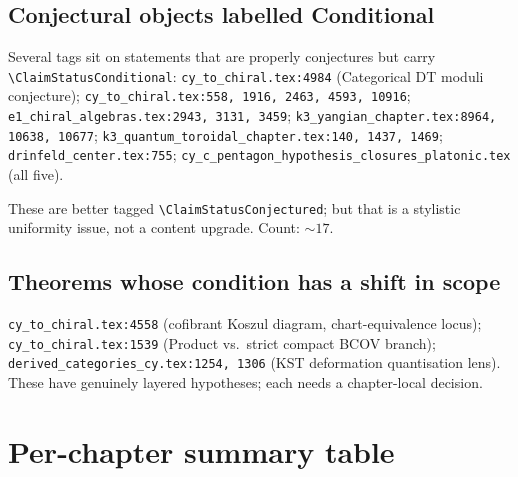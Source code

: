 \documentclass[11pt]{amsart}
\begin{document}
{{\subsection{Conjectural objects labelled Conditional}

Several tags sit on statements that are properly conjectures but carry
\texttt{\textbackslash ClaimStatusConditional}: \texttt{cy\_to\_chiral.tex:4984} (Categorical DT
moduli conjecture); \texttt{cy\_to\_chiral.tex:558, 1916, 2463, 4593, 10916};
\texttt{e1\_chiral\_algebras.tex:2943, 3131, 3459}; \texttt{k3\_yangian\_chapter.tex:8964, 10638, 10677}; \texttt{k3\_quantum\_toroidal\_chapter.tex:140, 1437, 1469}; \texttt{drinfeld\_center.tex:755}; \texttt{cy\_c\_pentagon\_hypothesis\_closures\_platonic.tex} (all five).

These are better tagged \texttt{\textbackslash ClaimStatusConjectured};
but that is a stylistic uniformity issue, not a content upgrade.
Count: $\sim 17$.

\subsection{Theorems whose condition has a shift in scope}

\texttt{cy\_to\_chiral.tex:4558} (cofibrant Koszul diagram,
chart-equivalence locus); \texttt{cy\_to\_chiral.tex:1539} (Product vs.\
strict compact BCOV branch); \texttt{derived\_categories\_cy.tex:1254, 1306} (KST
deformation quantisation lens). These have genuinely layered
hypotheses; each needs a chapter-local decision.

\section{Per-chapter summary table}
\label{sec:per-chapter}

}}
\end{document}
